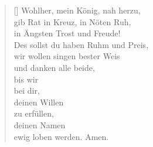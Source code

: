 \begin{multicols}{2}
\begin{verse}[\versewidth]
 Wohlher, mein König, nah herzu,\\
gib Rat in Kreuz, in Nöten Ruh,\\
in Ängsten Trost und Freude!\\
Des sollst du haben Ruhm und Preis,\\
wir wollen singen bester Weis\\
und danken alle beide,\\
bis wir\\
bei dir,\\
deinen Willen\\
zu erfüllen,\\
deinen Namen\\
ewig loben werden. Amen.

\end{verse}
\end{multicols}
